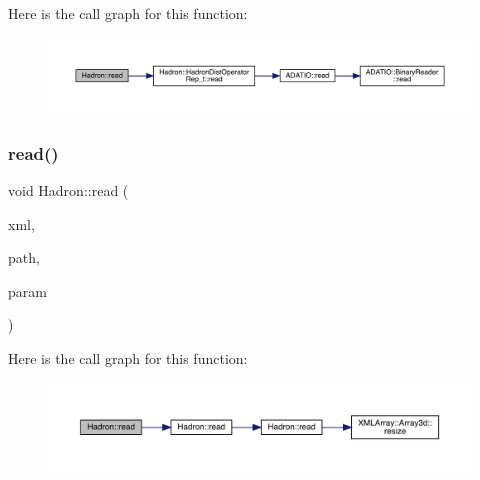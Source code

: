 Here is the call graph for this function\+:\nopagebreak
\begin{figure}[H]
\begin{center}
\leavevmode
\includegraphics[width=350pt]{d1/daf/namespaceHadron_adeba574c3428db28a2e7054d5f4d32d6_cgraph}
\end{center}
\end{figure}
\mbox{\label{namespaceHadron_af2bd5c5dd10efe01fefda4ec1c5ce04d}} 
\subsubsection{\texorpdfstring{read()}{read()}\hspace{0.1cm}{\footnotesize\ttfamily [91/94]}}
{\footnotesize\ttfamily void Hadron\+::read (\begin{DoxyParamCaption}\item[{\mbox{\hyperlink{classADATXML_1_1XMLReader}{X\+M\+L\+Reader}} \&}]{xml,  }\item[{const std\+::string \&}]{path,  }\item[{\mbox{\hyperlink{structHadron_1_1SingleHadronQuarkFlavor__t}{Single\+Hadron\+Quark\+Flavor\+\_\+t}} \&}]{param }\end{DoxyParamCaption})}

Here is the call graph for this function\+:\nopagebreak
\begin{figure}[H]
\begin{center}
\leavevmode
\includegraphics[width=350pt]{d1/daf/namespaceHadron_af2bd5c5dd10efe01fefda4ec1c5ce04d_cgraph}
\end{center}
\end{figure}
\mbox{\label{namespaceHadron_ae80a1bcfb7767fb7993d4a439d6493ba}} 
